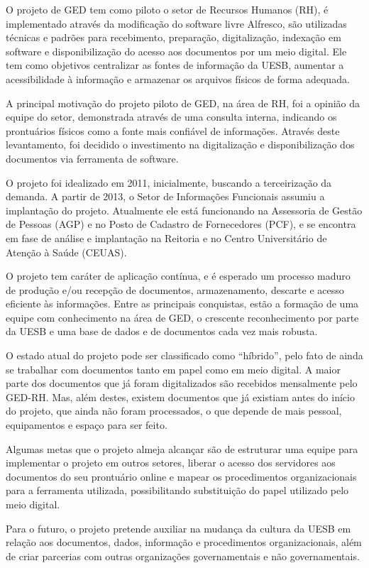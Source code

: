 O projeto de GED tem como piloto o setor de Recursos Humanos (RH), é implementado através da modificação do software livre Alfresco, são utilizadas técnicas e padrões para recebimento, preparação, digitalização, indexação em software e disponibilização do acesso aos documentos por um meio digital. Ele tem como objetivos centralizar as fontes de informação da UESB, aumentar a acessibilidade à informação e armazenar os arquivos físicos de forma adequada.

A principal motivação do projeto piloto de GED, na área de RH, foi a opinião da equipe do setor, demonstrada através de uma consulta interna, indicando os prontuários físicos como a fonte mais confiável de informações. Através deste levantamento, foi decidido o investimento na digitalização e disponibilização dos documentos via ferramenta de software.

O projeto foi idealizado em 2011, inicialmente, buscando a terceirização da demanda. A partir de 2013, o Setor de Informações Funcionais assumiu a implantação do projeto. Atualmente ele está funcionando na Assessoria de Gestão de Pessoas (AGP) e no Posto de Cadastro de Fornecedores (PCF), e se encontra em fase de análise e implantação na Reitoria e no Centro Universitário de Atenção à Saúde (CEUAS). 

O projeto tem caráter de aplicação contínua, e é esperado um processo maduro de produção e/ou recepção de documentos, armazenamento, descarte e acesso eficiente às informações. Entre as principais conquistas, estão a formação de uma equipe com conhecimento na área de GED, o crescente reconhecimento por parte da UESB e uma base de dados e de documentos cada vez mais robusta. 

O estado atual do projeto pode ser classificado como ``híbrido'', pelo fato de ainda se trabalhar com documentos tanto em papel como em meio digital. A maior parte dos documentos que já foram digitalizados são recebidos mensalmente pelo GED-RH. Mas, além destes, existem documentos que já existiam antes do início do projeto, que ainda não foram processados, o que depende de mais pessoal, equipamentos e espaço para ser feito.

Algumas metas que o projeto almeja alcançar são de estruturar uma equipe para implementar o projeto em outros setores, liberar o acesso dos servidores aos documentos do seu prontuário online e mapear os procedimentos organizacionais para a ferramenta utilizada, possibilitando substituição do papel utilizado pelo meio digital.  

Para o futuro, o projeto pretende auxiliar na mudança da cultura da UESB em relação aos documentos, dados, informação e procedimentos organizacionais, além de criar parcerias com outras organizações governamentais e não governamentais. 

